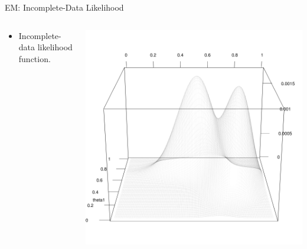 \documentclass[dvipdfmx,bigger,aspectratio=169]{beamer}
\begin{document}
\begin{frame}[label={sec:org5d6a369}]{EM: Incomplete-Data Likelihood}
\begin{columns}
\begin{column}{0.50\columnwidth}
\begin{itemize}
\item Incomplete-data likelihood function.
\end{itemize}
\end{column}
\begin{column}{0.50\columnwidth}
\begin{center}
\includegraphics[page=1,keepaspectratio,width=\textwidth,height=\textheight]{./source/em_rgl_.png}
\end{center}
\end{column}
\end{columns}
\end{frame}
\end{document}
